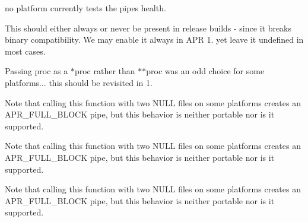 \begin{DoxyRefList}
no platform currently tests the pipes health.  
\item[\label{bug__bug000011}%
\hypertarget{bug__bug000011}{}%
Global \hyperlink{structapr__proc__t_a72ed1c58c3f08ffa7202fa80e870cd54}{apr\+\_\+proc\+\_\+t\+:\+:invoked} ]This should either always or never be present in release builds -\/ since it breaks binary compatibility. We may enable it always in A\+PR 1. yet leave it undefined in most cases.  
\item[\label{bug__bug000009}%
\hypertarget{bug__bug000009}{}%
Global \hyperlink{group__apr__thread__proc_ga506183074e8413c3ff597539e4768ea4}{apr\+\_\+proc\+\_\+wait\+\_\+all\+\_\+procs} (\hyperlink{structapr__proc__t}{apr\+\_\+proc\+\_\+t} $\ast$proc, int $\ast$exitcode, apr\+\_\+exit\+\_\+why\+\_\+e $\ast$exitwhy, apr\+\_\+wait\+\_\+how\+\_\+e waithow, apr\+\_\+pool\+\_\+t $\ast$p)]Passing proc as a $\ast$proc rather than $\ast$$\ast$proc was an odd choice for some platforms... this should be revisited in 1.  
\item[\label{bug__bug000008}%
\hypertarget{bug__bug000008}{}%
Global \hyperlink{group__apr__thread__proc_ga6fad364c6c820e37c0915435cfb3921f}{apr\+\_\+procattr\+\_\+child\+\_\+err\+\_\+set} (struct apr\+\_\+procattr\+\_\+t $\ast$attr, apr\+\_\+file\+\_\+t $\ast$child\+\_\+err, apr\+\_\+file\+\_\+t $\ast$parent\+\_\+err)]Note that calling this function with two N\+U\+LL files on some platforms creates an A\+P\+R\+\_\+\+F\+U\+L\+L\+\_\+\+B\+L\+O\+CK pipe, but this behavior is neither portable nor is it supported. 
\item[\label{bug__bug000006}%
\hypertarget{bug__bug000006}{}%
Global \hyperlink{group__apr__thread__proc_ga24f40119b1aa07dd45a681a44915cb1b}{apr\+\_\+procattr\+\_\+child\+\_\+in\+\_\+set} (struct apr\+\_\+procattr\+\_\+t $\ast$attr, apr\+\_\+file\+\_\+t $\ast$child\+\_\+in, apr\+\_\+file\+\_\+t $\ast$parent\+\_\+in)]Note that calling this function with two N\+U\+LL files on some platforms creates an A\+P\+R\+\_\+\+F\+U\+L\+L\+\_\+\+B\+L\+O\+CK pipe, but this behavior is neither portable nor is it supported. 
\item[\label{bug__bug000007}%
\hypertarget{bug__bug000007}{}%
Global \hyperlink{group__apr__thread__proc_gabb97e9a49021ab4452ae3f1a281c977f}{apr\+\_\+procattr\+\_\+child\+\_\+out\+\_\+set} (struct apr\+\_\+procattr\+\_\+t $\ast$attr, apr\+\_\+file\+\_\+t $\ast$child\+\_\+out, apr\+\_\+file\+\_\+t $\ast$parent\+\_\+out)]Note that calling this function with two N\+U\+LL files on some platforms creates an A\+P\+R\+\_\+\+F\+U\+L\+L\+\_\+\+B\+L\+O\+CK pipe, but this behavior is neither portable nor is it supported. 
$$
\end{DoxyRefList}
